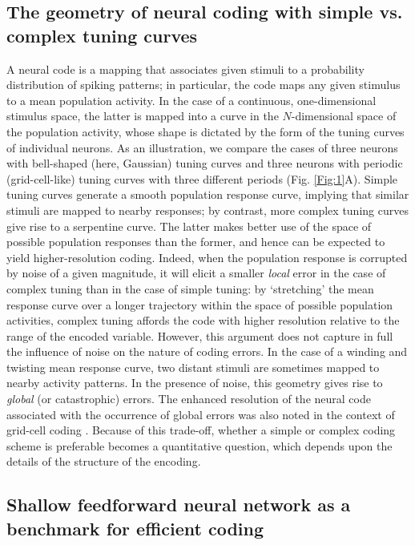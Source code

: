 \documentclass[a4paper]{article}%
\begin{document}
\subsection*{The geometry of neural coding with simple vs. complex tuning
curves}

A neural code is a mapping that associates given stimuli to a probability
distribution of spiking patterns; in particular, the code maps any given
stimulus to a mean population activity. In the case of a continuous,
one-dimensional stimulus space, the latter is mapped into a curve in the
$N$-dimensional space of the population activity, whose shape is dictated by
the form of the tuning curves of individual neurons. As an illustration, we
compare the cases of three neurons with bell-shaped (here, Gaussian) tuning
curves and three neurons with periodic (grid-cell-like) tuning curves with
three different periods (Fig. \ref{Fig:1}A). Simple tuning curves generate a
smooth population response curve, implying that similar stimuli are mapped to
nearby responses; by contrast, more complex tuning curves give rise to a
serpentine curve. The latter makes better use of the space of possible
population responses than the former, and hence can be expected to yield
higher-resolution coding. Indeed, when the population response is corrupted by
noise of a given magnitude, it will elicit a smaller \textit{local} error in
the case of complex tuning than in the case of simple tuning: by `stretching'
the mean response curve over a longer trajectory within the space of possible
population activities, complex tuning affords the code with higher resolution
relative to the range of the encoded variable. However, this argument does not
capture in full the influence of noise on the nature of coding errors. In the
case of a winding and twisting mean response curve, two distant stimuli are
sometimes mapped to nearby activity patterns. In the presence of noise, this
geometry gives rise to \textit{global} (or catastrophic) errors. The enhanced
resolution of the neural code associated with the occurrence of global errors
was also noted in the context of grid-cell coding
\cite{Welinder2008GridLearning,Sreenivasan2011GridComputation}. Because of
this trade-off, whether a simple or complex coding scheme is preferable
becomes a quantitative question, which depends upon the details of the
structure of the encoding.

\subsection*{Shallow feedforward neural network as a benchmark for efficient
coding}
\end{document}
